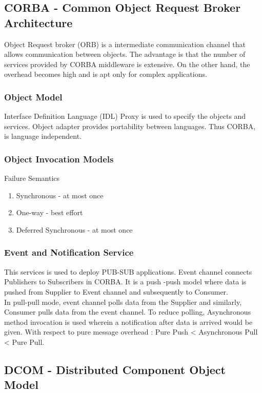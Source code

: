 \documentclass[a4paper]{article}
\begin{document}
\subsection{CORBA - Common Object Request Broker Architecture}

Object Request broker (ORB) is a intermediate communication channel that allows communication between objects. The advantage is that the number of services provided by CORBA middleware is extensive. On the other hand, the overhead becomes high and is apt only for complex applications.

\subsubsection{Object Model}

Interface Definition Language (IDL) Proxy is used to specify the objects and services. Object adapter provides portability between languages. Thus CORBA, is language independent.

\subsubsection{Object Invocation Models}
Failure Semantics
\begin{enumerate}
\item Synchronous - at most once 
\item One-way  - best effort
\item Deferred Synchronous - at most once
\end{enumerate}

\subsubsection{Event and Notification Service}
This services is used to deploy PUB-SUB applications. Event channel connects Publishers to Subscribers in CORBA. It is a push -push model where data is pushed from Supplier to Event channel and subsequently to Consumer.\\

In pull-pull mode, event channel polls data from the Supplier and similarly, Consumer pulls data from the event channel. To reduce polling, Asynchronous method invocation is used wherein a notification after data is arrived would be given. With respect to pure message overhead :  Pure Push < Asynchronous Pull < Pure Pull.

\subsection{DCOM - Distributed Component Object Model}
\end{document}

